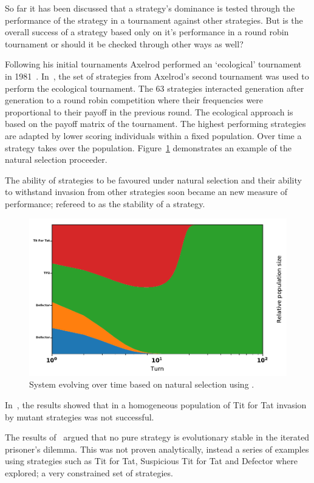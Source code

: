 \documentclass{article}
\begin{document}
So far it has been discussed that a strategy's dominance is tested through
the performance of the strategy in a tournament against other strategies.
But is the overall success of a strategy based only on it's performance in a 
round robin tournament or should it be checked through other ways as well?

Following his initial tournaments Axelrod performed an `ecological' tournament
in 1981~\cite{Axelrod1981}. In~\cite{Axelrod1981}, the set of strategies from 
Axelrod's second tournament was used to perform the ecological tournament. The 
63 strategies interacted generation after generation to a round robin competition
where their frequencies were proportional to their payoff in the previous round.
The ecological approach is based on the payoff matrix of the tournament. The
highest performing strategies are adapted by lower scoring individuals
within a fixed population. Over time a strategy takes over the population.
Figure~\ref{fig:ecological.tournament} demonstrates an example of the
natural selection proceeder.

The ability of strategies to be favoured under natural selection and their 
ability to withstand invasion from other strategies soon became an new measure 
of performance; refereed to as the stability of a strategy.

\begin{figure}[!hbtp]
    \centering
    \includegraphics[width=.6\textwidth]{./assets/images/ecological.pdf}
    \caption{System evolving over time based on natural selection using
    \cite{axelrodproject}.}
    \label{fig:ecological.tournament}
\end{figure}

In~\cite{Axelrod1981}, the results showed that in a homogeneous
population of Tit for Tat invasion by mutant strategies was not successful.

The results of~\cite{Boyd1987} argued that no pure strategy is evolutionary
stable in the iterated prisoner's dilemma. This was not proven analytically, instead
a series of examples using strategies such as Tit for Tat, Suspicious
Tit for Tat and Defector where explored; a very constrained set of strategies.
\end{document}
